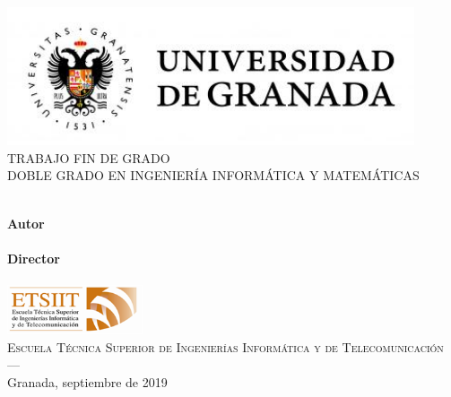 \begin{titlepage}
 
 
\newlength{\centeroffset}
\setlength{\centeroffset}{-0.5\oddsidemargin}
\addtolength{\centeroffset}{0.5\evensidemargin}
\thispagestyle{empty}

\noindent\hspace*{\centeroffset}\begin{minipage}{\textwidth}

\centering
\includegraphics[width=0.9\textwidth]{imagenes/logo_ugr.jpg}\\[1.4cm]

\textsc{ \Large TRABAJO FIN DE GRADO\\[0.2cm]}
\textsc{DOBLE GRADO EN INGENIERÍA INFORMÁTICA Y MATEMÁTICAS}\\[1cm]
% 
{\large\bfseries \myTitle\\}
\end{minipage}

\vspace{1.1cm}
\noindent\hspace*{\centeroffset}\begin{minipage}{\textwidth}
\centering

\textbf{Autor}\\ {\myName}\\[2.5ex]
\textbf{Director}\\
{\myProf}\\[2cm]
\includegraphics[width=0.3\textwidth]{imagenes/etsiit_logo.png}\\[0.1cm]
\textsc{Escuela Técnica Superior de Ingenierías Informática y de Telecomunicación}\\
\textsc{---}\\
Granada, septiembre de 2019
\end{minipage}
\end{titlepage}

